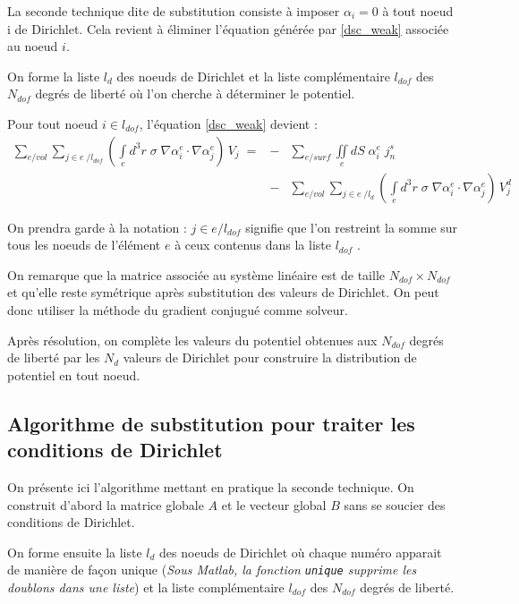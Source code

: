 \documentclass[a4paper, 11pt]{article}
\begin{document}
La seconde technique dite de substitution consiste à imposer $\alpha_i=0$ à tout noeud i de Dirichlet. 
Cela revient
à éliminer l'équation générée par \eqref{dsc_weak} associée au noeud $i$.

On forme la liste $l_d$ des noeuds de Dirichlet et la liste complémentaire $l_{dof}$ 
des $N_{dof}$ degrés de liberté où l'on cherche à déterminer le potentiel.

Pour tout noeud $i \in l_{dof}$, l'équation \eqref{dsc_weak} devient :
\begin{eqnarray*}
\sum\limits_{e/vol}^{} {} \sum\limits_{j \in e\; / l_{dof}} {\left( {\int\limits_e {{d^3}r\;\sigma \;\nabla \alpha _i^e \cdot \nabla \alpha _j^e} } \right)} \,{V_j}\; = & -& \sum\limits_{e/surf}^{} {} \iint\limits_e 
 {dS\;} \alpha _i^e\;j_n^s \\
& -& \sum\limits_{e/vol}^{} {} \sum\limits_{j \in e\; / l_{d}} {\left( {\int\limits_e {{d^3}r\;\sigma \;\nabla \alpha _i^e \cdot \nabla \alpha _j^e} } \right)} \,{V_j^d}
\end{eqnarray*}

On prendra garde à la notation : $j \in e /l_{dof}$ signifie que l'on restreint la somme sur tous
les noeuds de l'élément $e$ à ceux contenus dans la liste $l_{dof}$ .

On remarque que la matrice associée au système linéaire est de taille $N_{dof} \times N_{dof}$
et qu'elle reste symétrique après substitution des valeurs de Dirichlet. On peut donc utiliser
la méthode du gradient conjugué comme solveur.

Après résolution, on complète les valeurs du potentiel obtenues aux
$N_{dof}$ degrés de liberté par les $N_d$ valeurs de Dirichlet pour construire
la distribution de potentiel en tout noeud.

\subsection{Algorithme de substitution pour traiter les conditions de Dirichlet}

On présente ici l'algorithme mettant en pratique la seconde technique.
On construit d'abord la matrice globale $A$ et le vecteur global $B$
sans se soucier des conditions de Dirichlet.

On forme ensuite la liste $l_d$ des noeuds de Dirichlet 
où chaque numéro apparait de manière de façon unique ({\it Sous Matlab, la fonction
 {\tt unique}   supprime les doublons dans une liste})
et la liste complémentaire $l_{dof}$ des $N_{dof}$ degrés de liberté.\\
\end{document}
